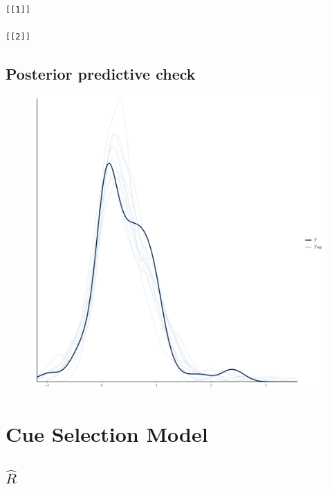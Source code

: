 \documentclass[
]{report}
\begin{document}
\begin{verbatim}
[[1]]

[[2]]
\end{verbatim}

\hypertarget{posterior-predictive-check-5}{%
\section{Posterior predictive
check}\label{posterior-predictive-check-5}}

\begin{figure}

{\centering \includegraphics[width=1\textwidth,height=\textheight]{diagnostic_plots_files/figure-pdf/unnamed-chunk-18-1.pdf}

}

\end{figure}

\hypertarget{cue-selection-model}{%
\chapter{Cue Selection Model}\label{cue-selection-model}}

\hypertarget{hatr-6}{%
\section{\texorpdfstring{\(\hat{R}\)}{\textbackslash hat\{R\}}}\label{hatr-6}}
\end{document}
